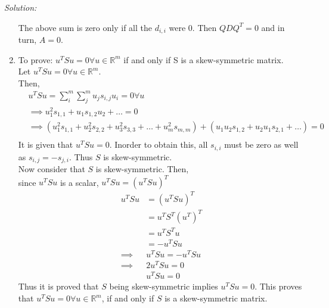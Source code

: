 \documentclass[fleqn]{article}
\newenvironment{solution}
    {\textit{Solution:}}
    {}
\begin{document}
\begin{solution}
\begin{enumerate}[label=(\alph*)]
        The above sum is zero only if all the $d_{i,i}$ were 0. Then $QDQ^{T} = 0$ and in turn, $A = 0$.

        \item To prove: $u^{T} S u = 0 \forall u \in \mathbb{R}^{m}$ if and only if S is a skew-symmetric matrix.\\
        Let $u^{T} S u = 0 \forall u \in \mathbb{R}^{m}$.\\
        Then,
        \begin{equation*}
            \begin{split}
                &u^{T} S u = \sum_{i}^{m}\sum_{j}^{m}u_{j}s_{i,j}u_{i} = 0 \forall u\\
                &\implies u_{1}^{2}s_{1,1} + u_{1}s_{1,2}u_{2} + \dots  = 0\\
                &\implies (u_{1}^{2}s_{1,1} + u_{2}^{2} s_{2,2} + u_{3}^{2}s_{3,3} + \dots + u_{m}^{2}s_{m,m})+ (u_{1}u_{2}s_{1,2} + u_{2}u_{1}s_{2,1} + \dots) = 0\\
            \end{split}
        \end{equation*}
        It is given that $u^{T}Su = 0$. Inorder to obtain this, all $s_{i,i}$ must be zero as well as $s_{i,j} = -s_{j,i}$. Thus $S$ is skew-symmetric.\\
        Now consider that $S$ is skew-symmetric. Then,\\
        since $u^{T}Su$ is a scalar, $u^{T}Su = (u^{T}Su)^{T}$
        \begin{equation*}
            \begin{split}
                u^{T} S u &= (u^{T}Su)^{T}\\
                &= u^{T}S^{T}(u^{T})^{T}\\
                &= u^{T}S^{T}u\\
                &= -u^{T}Su\\
                \implies &u^{T}Su = - u^{T}Su\\
                \implies &2 u^{T}Su = 0\\
                &u^{T}Su = 0
            \end{split}
        \end{equation*}
        Thus it is proved that $S$ being skew-symmetric implies $u^{T}Su = 0$. This proves that $u^{T}Su = 0 \forall u \in \mathbb{R}^{m}$, if and only if $S$ is a skew-symmetric matrix.\\
    \end{enumerate}
\end{solution}
\end{document}

